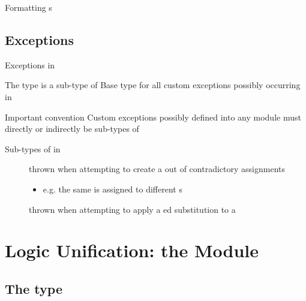\documentclass[handout]{beamer}
\begin{document}
\begin{frame}{Formatting s}
\end{frame}

\subsection{Exceptions}

\begin{frame}[allowframebreaks]{Exceptions in \twopkt{}}
    \begin{block}{The  type is a sub-type of }\centering
        Base type for all custom exceptions possibly occurring in \twopkt{}
    \end{block}

    \begin{alertblock}{Important convention}\centering
        Custom exceptions possibly defined into any \twopkt{} module must directly or indirectly be sub-types of 
    \end{alertblock}

    \framebreak

    \begin{block}{Sub-types of  in }
        \begin{description}
            \item[] thrown when attempting to create a  out of contradictory assignments
            \begin{itemize}\small
                \item e.g. the same  is assigned to different s
            \end{itemize}

            \item[] thrown when attempting to apply a ed substitution to a 
        \end{description}
    \end{block}
\end{frame}

\section{Logic Unification: the  Module}

\subsection{The  type}
\end{document}
